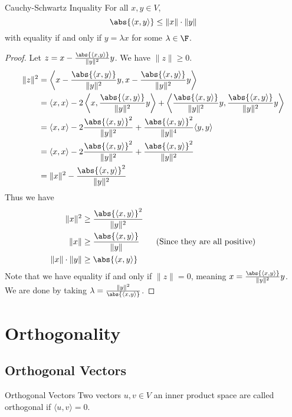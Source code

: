 \begin{prp}{Cauchy-Schwartz Inquality}{} For all $x,y\in V$, $$\abs{\langle x,y\rangle}\leq\|x\|\cdot\|y\|$$ with equality if and only if $y=\lambda x$ for some $\lambda\in\F$. 
\begin{proof} Let $z=x-\frac{\abs{\langle x,y\rangle}}{\|y\|^2}y$. We have $\|z\|\geq0$. 
\begin{align*}
\|z\|^2&=\left\langle x-\frac{\abs{\langle x,y\rangle}}{\|y\|^2}y,x-\frac{\abs{\langle x,y\rangle}}{\|y\|^2}y\right\rangle\\
&=\langle x,x\rangle-2\left\langle x,\frac{\abs{\langle x,y\rangle}}{\|y\|^2}y\right\rangle+\left\langle \frac{\abs{\langle x,y\rangle}}{\|y\|^2}y,\frac{\abs{\langle x,y\rangle}}{\|y\|^2}y\right\rangle\\
&=\langle x,x\rangle-2\frac{\abs{\langle x,y\rangle}^2}{\|y\|^2}+\frac{\abs{\langle x,y\rangle}^2}{\|y\|^4}\langle y,y\rangle\\
&=\langle x,x\rangle-2\frac{\abs{\langle x,y\rangle}^2}{\|y\|^2}+\frac{\abs{\langle x,y\rangle}^2}{\|y\|^2}\\
&=\|x\|^2-\frac{\abs{\langle x,y\rangle}^2}{\|y\|^2}\\
\end{align*}
Thus we have
\begin{align*}
\|x\|^2&\geq\frac{\abs{\langle x,y\rangle}^2}{\|y\|^2}\\
\|x\|&\geq\frac{\abs{\langle x,y\rangle}}{\|y\|}\tag{Since they are all positive}\\
\|x\|\cdot\|y\|&\geq\abs{\langle x,y\rangle}
\end{align*}
Note that we have equality if and only if $\|z\|=0$, meaning $x=\frac{\abs{\langle x,y\rangle}}{\|y\|^2}y$. We are done by taking $\lambda=\frac{\|y\|^2}{\abs{\langle x,y\rangle}}$. 
\end{proof}
\end{prp}

\pagebreak
\section{Orthogonality}
\subsection{Orthogonal Vectors}
\begin{defn}{Orthogonal Vectors}{} Two vectors $u,v\in V$ an inner product space are called orthogonal if $\langle u,v\rangle=0$. 
\end{defn}

